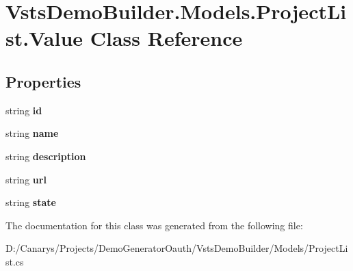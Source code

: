 \hypertarget{class_vsts_demo_builder_1_1_models_1_1_project_list_1_1_value}{}\section{Vsts\+Demo\+Builder.\+Models.\+Project\+List.\+Value Class Reference}
\label{class_vsts_demo_builder_1_1_models_1_1_project_list_1_1_value}
\subsection*{Properties}
\begin{DoxyCompactItemize}
\item 
\mbox{\label{class_vsts_demo_builder_1_1_models_1_1_project_list_1_1_value_a9a3fbc720df776930f76f1b5454e604b}} 
string {\bfseries id}
\item 
\mbox{\label{class_vsts_demo_builder_1_1_models_1_1_project_list_1_1_value_a0f3aa52fb2af1d4062bc43002bbe268d}} 
string {\bfseries name}
\item 
\mbox{\label{class_vsts_demo_builder_1_1_models_1_1_project_list_1_1_value_ac600d128a9cb48f61de71b548d628159}} 
string {\bfseries description}
\item 
\mbox{\label{class_vsts_demo_builder_1_1_models_1_1_project_list_1_1_value_a8253d295e4aafa3c4896cf145bcbafa4}} 
string {\bfseries url}
\item 
\mbox{\label{class_vsts_demo_builder_1_1_models_1_1_project_list_1_1_value_a33eac25f37d706af302e88d5a3a873b2}} 
string {\bfseries state}
\end{DoxyCompactItemize}


The documentation for this class was generated from the following file\+:\begin{DoxyCompactItemize}
\item 
D\+:/\+Canarys/\+Projects/\+Demo\+Generator\+Oauth/\+Vsts\+Demo\+Builder/\+Models/Project\+List.\+cs\end{DoxyCompactItemize}
